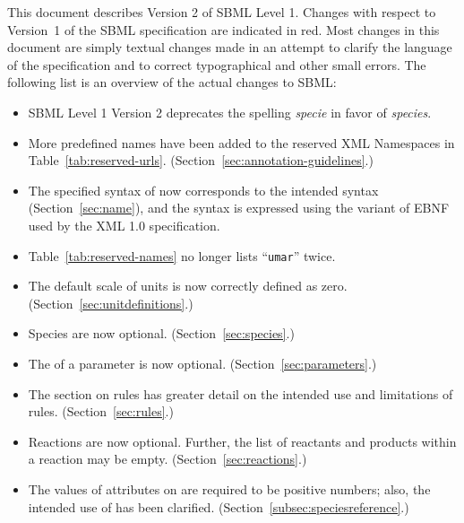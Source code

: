 \documentclass[10pt]{cekarticle}
\newcommand{\vref}[1]{\ref{#1}}
\newenvironment{blockChanged}{\color{BrickRed}}{}
\begin{document}
\begin{blockChanged}
  This document describes Version 2 of SBML Level 1.  Changes with respect
  to Version~1 of the SBML specification are indicated in red.  Most
  changes in this document are simply textual changes made in an attempt to
  clarify the language of the specification and to correct typographical
  and other small errors.  The following list is an overview of the actual
  changes to SBML:
\vspace*{-0.75ex}\begin{itemize}\setlength{\parskip}{0.6ex}
  
\item SBML Level 1 Version 2 deprecates the spelling \emph{specie} 
  in favor of \emph{species}.
  
\item More predefined names have been added to the reserved XML Namespaces
      in Table~\ref{tab:reserved-urls}. (Section~\ref{sec:annotation-guidelines}.)

\item The specified syntax of  now corresponds to the intended
  syntax (Section~\ref{sec:name}), and the syntax is expressed using the
  variant of EBNF used by the XML 1.0 specification.

\item Table~\vref{tab:reserved-names} no longer lists ``\texttt{umar}'' twice.

\item The default scale of units is now correctly defined as zero.
  (Section~\ref{sec:unitdefinitions}.)

\item Species are now optional.  (Section~\ref{sec:species}.)

\item The  of a parameter is now optional.
  (Section~\ref{sec:parameters}.)
  
\item The section on rules has greater detail on the intended use and
  limitations of rules.  (Section~\ref{sec:rules}.)
  
\item Reactions are now optional.  Further, the list of reactants and
  products within a reaction may be empty.  (Section~\ref{sec:reactions}.)
  
\item The values of attributes on  are required to
  be positive numbers; also, the intended use of 
  has been clarified.  (Section~\ref{subsec:speciesreference}.)
  

\end{itemize}
\end{blockChanged}
\end{document}
